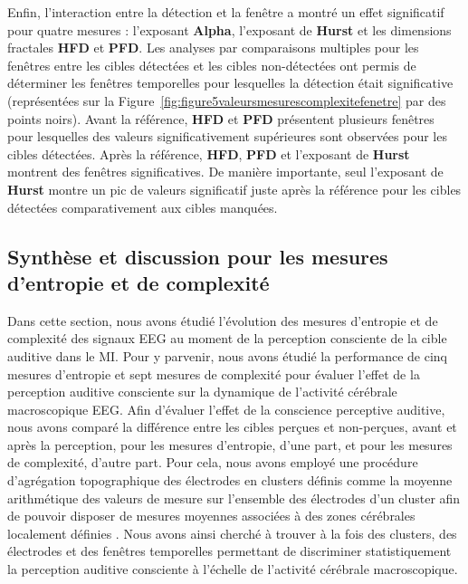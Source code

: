 Enfin, l'interaction entre la détection et la fenêtre a montré un effet significatif pour quatre mesures : l'exposant \textbf{Alpha}, l'exposant de \textbf{Hurst} et les dimensions fractales \textbf{HFD} et \textbf{PFD}.
Les analyses par comparaisons multiples pour les fenêtres entre les cibles détectées et les cibles non-détectées ont permis de déterminer les fenêtres temporelles pour lesquelles la détection était significative (représentées sur la Figure~\ref{fig:figure5valeursmesurescomplexitefenetre} par des points noirs). 
Avant la référence, \textbf{HFD} et \textbf{PFD} présentent plusieurs fenêtres pour lesquelles des valeurs significativement supérieures sont observées pour les cibles détectées. 
Après la référence, \textbf{HFD}, \textbf{PFD} et l'exposant de \textbf{Hurst} montrent des fenêtres significatives. 
De manière importante, seul l'exposant de \textbf{Hurst} montre un pic de valeurs significatif juste après la référence pour les cibles détectées comparativement aux cibles manquées.

\subsection{Synthèse et discussion pour les mesures d'entropie et de complexité}
\label{synthesediscussionmesuresentropiecomplexite}

Dans cette section, nous avons étudié l’évolution des mesures d'entropie et de complexité des signaux EEG au moment de la perception consciente de la cible auditive dans le MI. 
Pour y parvenir, nous avons étudié la performance de cinq mesures d'entropie et sept mesures de complexité pour évaluer l'effet de la perception auditive consciente sur la dynamique de l'activité cérébrale macroscopique EEG. 
Afin d'évaluer l'effet de la conscience perceptive auditive, nous avons comparé la différence entre les cibles perçues et non-perçues, avant et après la perception, pour les mesures d'entropie, d'une part, et pour les mesures de complexité, d'autre part. 
Pour cela, nous avons employé une procédure d'agrégation topographique des électrodes en clusters définis comme la moyenne arithmétique des valeurs de mesure sur l'ensemble des électrodes d'un cluster afin de pouvoir disposer de mesures moyennes associées à des zones cérébrales localement définies \citep{grabner2012oscillatory}. 
Nous avons ainsi cherché à trouver à la fois des clusters, des électrodes et des fenêtres temporelles permettant de discriminer statistiquement la perception auditive consciente à l'échelle de l'activité cérébrale macroscopique.

